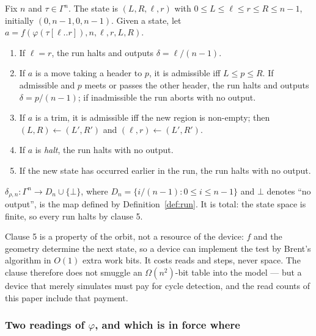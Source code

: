 \begin{definition}[Run]\label{def:run}
Fix $n$ and $\tau\in\Gamma^{n}$. The state is $(L,R,\ell,r)$ with $0\le L\le\ell\le r\le R\le n-1$,
initially $(0,n-1,0,n-1)$. Given a state, let $a=f(\varphi(\tau[\ell..r]),n,\ell,r,L,R)$.
\begin{enumerate}
\item If $\ell=r$, the run halts and outputs $\delta=\ell/(n-1)$.
\item If $a$ is a move taking a header to $p$, it is admissible iff $L\le p\le R$. If admissible and
$p$ meets or passes the other header, the run halts and outputs $\delta=p/(n-1)$; if inadmissible the
run aborts with no output.
\item If $a$ is a trim, it is admissible iff the new region is non-empty; then $(L,R)\leftarrow(L',R')$
and $(\ell,r)\leftarrow(L',R')$.
\item If $a$ is \emph{halt}, the run halts with no output.
\item If the new state has occurred earlier in the run, the run halts with no output.
\end{enumerate}
\end{definition}

\begin{definition}\label{def:output}
$\delta_{\rho,n}:\Gamma^{n}\to D_{n}\cup\{\bot\}$, where $D_{n}=\{i/(n-1):0\le i\le n-1\}$ and
$\bot$ denotes ``no output'', is the map defined by Definition~\ref{def:run}. It is total: the state
space is finite, so every run halts by clause 5.
\end{definition}

\begin{remark}\label{rem:repeat}
Clause 5 is a property of the orbit, not a resource of the device: $f$ and the geometry determine the
next state, so a device can implement the test by Brent's algorithm in $O(1)$ extra work bits. It
costs reads and steps, never space. The clause therefore does not smuggle an $\Omega(n^{2})$-bit
table into the model --- but a device that merely simulates must pay for cycle detection, and the
read counts of this paper include that payment.
\end{remark}

\subsubsection{Two readings of $\varphi$, and which is in force where}

